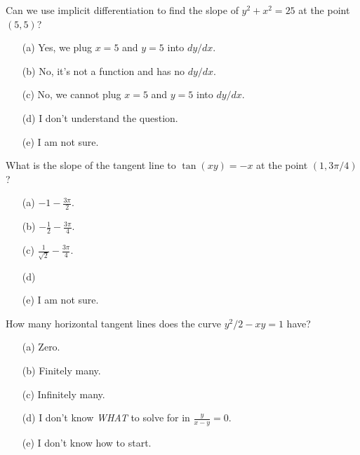 \documentclass[14pt]{beamer}
\begin{document}
\begin{frame}
  Can we use implicit differentiation to find the slope of \(y^{2} + x^{2} = 25\) at the point \((5,5)\)?

  \medskip
  \begin{itemize} \setlength\itemsep{2ex}
    \item[(a)] Yes, we plug \(x = 5\) and \(y = 5\) into \(dy/dx\).
    \item[(b)] No, it's not a function and has no \(dy/dx\).
    \item[(c)] No, we cannot plug \(x = 5\) and \(y = 5\) into \(dy/dx\).
    \item[(d)] I don't understand the question.
    \item[(e)] I am not sure.
  \end{itemize} 
\end{frame}

\begin{frame}
  What is the slope of the tangent line to \(\tan(xy) = -x\) at the point \((1, 3\pi/4)\)?

  \medskip
  \begin{itemize} \setlength\itemsep{2ex}
    \item[(a)] \(-1 - \frac{3\pi}{2}\). 
    \item[(b)] \(-\frac{1}{2} - \frac{3\pi}{4}\). 
    \item[(c)] \(\frac{1}{\sqrt{2}} - \frac{3\pi}{4}\). 
    \item[(d)] 
    \item[(e)] I am not sure.
  \end{itemize} 
\end{frame}


\begin{frame}
  How many horizontal tangent lines does the curve \(y^{2}/2 - xy = 1\) have? 

  \medskip
  \begin{itemize} \setlength\itemsep{2ex}
    \item[(a)] Zero.
    \item[(b)] Finitely many.
    \item[(c)] Infinitely many.
    \item[(d)] I don't know \emph{WHAT} to solve for in \(\tfrac{y}{x - y} = 0\).
    \item[(e)] I don't know how to start.
  \end{itemize} 
\end{frame}
\end{document}

